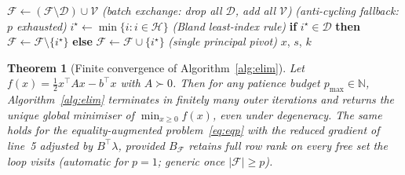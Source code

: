 \documentclass[10pt,a4paper]{amsart}
\newtheorem{theorem}{Theorem}
\begin{document}
\begin{algorithm}[ht]
\begin{algorithmic}[1]
    \State $\mathcal{F} \leftarrow (\mathcal{F} \setminus \mathcal{D}) \cup \mathcal{V}$
      \hfill\textit{(batch exchange: drop all $\mathcal{D}$, add all $\mathcal{V}$)}
  \Else
    \hfill\textit{(anti-cycling fallback: $p$ exhausted)}
    \State $i^\star \leftarrow \min\{i : i \in \mathcal{H}\}$
      \hfill\textit{(Bland least-index rule)}
    \State \textbf{if} $i^\star \in \mathcal{D}$ \textbf{ then } $\mathcal{F} \leftarrow \mathcal{F} \setminus \{i^\star\}$
           \textbf{ else } $\mathcal{F} \leftarrow \mathcal{F} \cup \{i^\star\}$
      \hfill\textit{(single principal pivot)}
  \EndIf
\EndLoop
\State \Return $x$, $s$, $k$
\end{algorithmic}
\end{algorithm}

\begin{theorem}[Finite convergence of Algorithm~\ref{alg:elim}]\label{thm:termination}
Let $f(x) = \tfrac{1}{2}x^\top A x - b^\top x$ with $A \succ 0$. Then for any patience budget
$p_{\max} \in \mathbb{N}$, Algorithm~\ref{alg:elim} terminates in finitely many outer
iterations and returns the unique global minimiser of $\min_{x \geq 0} f(x)$, even under degeneracy. The same holds for the equality-augmented
problem~\eqref{eq:eqp} with the reduced gradient of line~5 adjusted by $B^\top\lambda$,
provided $B_{\mathcal{F}}$ retains full row rank on every free set the loop visits (automatic
for $p=1$; generic once $|\mathcal{F}| \geq p$).
\end{theorem}
\end{document}
